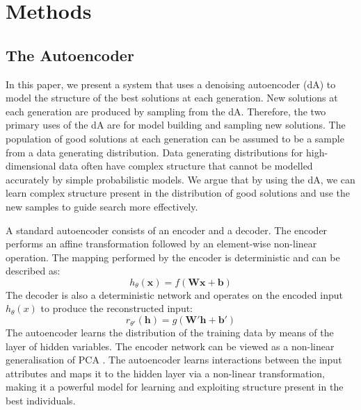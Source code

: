 \documentclass[runningheads,a4paper]{llncs}
\begin{document}
\section{Methods}

\subsection{The Autoencoder}

In this paper, we present a system that uses a denoising autoencoder (dA) to model the structure of the best solutions at each generation. New solutions at each generation are produced by sampling from the dA. Therefore, the two primary uses of the dA are for model building and sampling new solutions. The population of good solutions at each generation can be assumed to be a sample from a data generating distribution. Data generating distributions for high-dimensional data often have complex structure that cannot be modelled accurately by simple probabilistic models. We argue that by using the dA, we can learn complex structure present in the distribution of good solutions and use the new samples to guide search more effectively. 




A standard autoencoder consists of an encoder and a decoder. The encoder performs an affine transformation followed by an element-wise non-linear operation. The mapping performed by the encoder is deterministic and can be described as: $$h_{\theta}(\mathbf{x}) = f(\mathbf{Wx + b})$$ The decoder is also a deterministic network and operates on the encoded input $h_{\theta}(x)$ to produce the reconstructed input: $$ r_{\theta'}(\mathbf{h}) = g(\mathbf{W'h + b'})$$ The autoencoder learns the distribution of the training data by means of the layer of hidden variables. The encoder network can be viewed as a non-linear generalisation of PCA \cite{hinton2006reducing}. The autoencoder learns interactions between the input attributes and maps it to the hidden layer via a non-linear transformation, making it a powerful model for learning and exploiting structure present in the best individuals.
\end{document}
